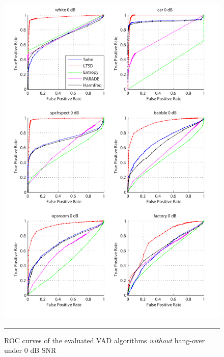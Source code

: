 \begin{figure}[htbp]
	\centering
		\includegraphics[width=1.0\columnwidth]{Figures/Chapter4/0dBnoh.pdf}
		\rule{37em}{0.5pt}
	\caption[ROC curves of the evaluated algorithms \emph{without} hang-over under 0 dB SNR]{ROC curves of the evaluated VAD algorithms \emph{without} hang-over under 0 dB SNR}
	\label{fig:0dBnoh}
\end{figure}

